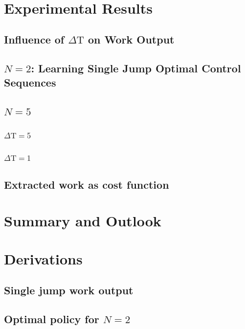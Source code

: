 \chapter{Experimental Results}

\section{Influence of $\Delta \mathrm{T}$ on Work Output} \label{dep_dt}

\section{$N=2$: Learning Single Jump Optimal Control Sequences} \label{n_2_ml}

\section{$N=5$}\label{n5}
\subsection{$\Delta \mathrm{T} = 5$}\label{n_5_ml}



\subsection{$\Delta \mathrm{T} = 1$}\label{n_5_dt1}


\section{Extracted work as cost function}\label{work_cost}


\chapter{Summary and Outlook}\label{outlook}


\appendix
\chapter{Derivations}
\section{Single jump work output}


\section{Optimal policy for $N=2$} \label{n2_opt_pol}

